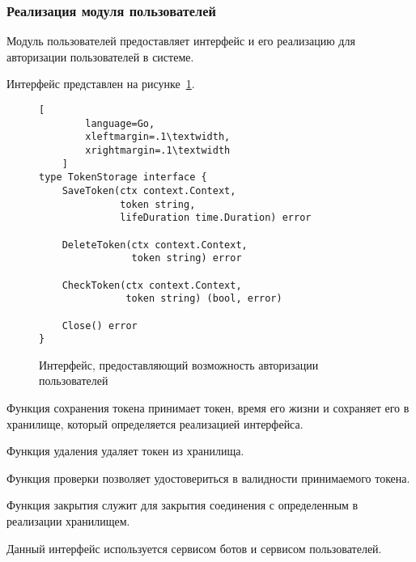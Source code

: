 \subsubsection{Реализация модуля пользователей}

Модуль пользователей предоставляет интерфейс и его реализацию для
авторизации пользователей в системе.

Интерфейс представлен на рисунке~\ref{f:auth-interface}.


\begin{figure}[ht]
	\centering
	\vspace{\toppaddingoffigure}
	\begin{lstlisting}[
        language=Go,
        xleftmargin=.1\textwidth,
        xrightmargin=.1\textwidth
    ]
type TokenStorage interface {
	SaveToken(ctx context.Context, 
              token string, 
              lifeDuration time.Duration) error

	DeleteToken(ctx context.Context, 
                token string) error

	CheckToken(ctx context.Context, 
               token string) (bool, error)

	Close() error
}

    \end{lstlisting}
	\caption{Интерфейс, предоставляющий возможность авторизации
		пользователей}
	\label{f:auth-interface}
\end{figure}

Функция сохранения токена принимает токен, время его жизни и
сохраняет его в хранилище, который определяется реализацией интерфейса.

Функция удаления удаляет токен из хранилища.

Функция проверки позволяет удостовериться в валидности
принимаемого токена.

Функция закрытия служит для закрытия соединения с определенным в
реализации хранилищем.

Данный интерфейс используется сервисом ботов и сервисом
пользователей.
